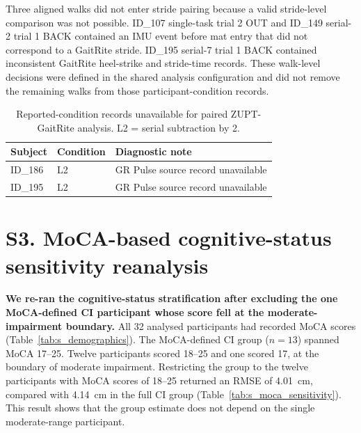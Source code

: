 \documentclass[fleqn,10pt,lineno]{wlpeerj}
\begin{document}
Three aligned walks did not enter stride pairing because a valid stride-level comparison was not possible. ID\_107 single-task trial 2 OUT and ID\_149 serial-2 trial 1 BACK contained an IMU event before mat entry that did not correspond to a GaitRite stride. ID\_195 serial-7 trial 1 BACK contained inconsistent GaitRite heel-strike and stride-time records. These walk-level decisions were defined in the shared analysis configuration and did not remove the remaining walks from those participant-condition records.

\begin{table}[!ht]
\centering
\caption{Reported-condition records unavailable for paired ZUPT-GaitRite analysis. L2 = serial subtraction by 2.}
\label{tab:s_excluded_pairs}
\footnotesize
\begin{tabular}{@{}llp{8.6cm}@{}}
\toprule
Subject & Condition & Diagnostic note \\
\midrule
ID\_186 & L2 & GR Pulse source record unavailable \\
ID\_195 & L2 & GR Pulse source record unavailable \\
\bottomrule
\end{tabular}
\end{table}


\section*{S3. MoCA-based cognitive-status sensitivity reanalysis}

\textbf{We re-ran the cognitive-status stratification after excluding the one MoCA-defined CI participant whose score fell at the moderate-impairment boundary.} All 32 analysed participants had recorded MoCA scores (Table~\ref{tab:s_demographics}). The MoCA-defined CI group ($n = 13$) spanned MoCA 17--25. Twelve participants scored 18--25 and one scored 17, at the boundary of moderate impairment. Restricting the group to the twelve participants with MoCA scores of 18--25 returned an RMSE of 4.01~cm, compared with 4.14~cm in the full CI group (Table~\ref{tab:s_moca_sensitivity}). This result shows that the group estimate does not depend on the single moderate-range participant.
\end{document}
